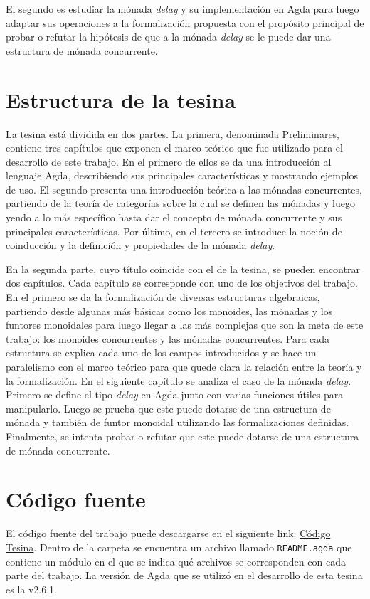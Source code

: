 El segundo es estudiar la mónada \textit{delay} y su implementación en Agda para luego adaptar sus operaciones a la formalización propuesta con el propósito principal de probar o refutar la hipótesis de que a la mónada \textit{delay} se le puede dar una estructura de mónada concurrente.

\section{Estructura de la tesina}

La tesina está dividida en dos partes. La primera, denominada Preliminares, contiene tres capítulos que exponen el marco teórico que fue utilizado para el desarrollo de este trabajo. En el primero de ellos se da una introducción al lenguaje Agda, describiendo sus principales características y mostrando ejemplos de uso. El segundo presenta una introducción teórica a las mónadas concurrentes, partiendo de la teoría de categorías sobre la cual se definen las mónadas y luego yendo a lo más específico hasta dar el concepto de mónada concurrente y sus principales características. Por último, en el tercero se introduce la noción de coinducción y la definición y propiedades de la mónada \textit{delay}. 

En la segunda parte, cuyo título coincide con el de la tesina, se pueden encontrar dos capítulos. Cada capítulo se corresponde con uno de los objetivos del trabajo. En el primero se da la formalización de diversas estructuras algebraicas, partiendo desde algunas más básicas como los monoides, las mónadas y los funtores monoidales para luego llegar a las más complejas que son la meta de este trabajo: los monoides concurrentes y las mónadas concurrentes. Para cada estructura se explica cada uno de los campos introducidos y se hace un paralelismo con el marco teórico para que quede clara la relación entre la teoría y la formalización. En el siguiente capítulo se analiza el caso de la mónada \textit{delay}. Primero se define el tipo \textit{delay} en Agda junto con varias funciones útiles para manipularlo. Luego se prueba que este puede dotarse de una estructura de mónada y también de funtor monoidal utilizando las formalizaciones definidas. Finalmente, se intenta probar o refutar que este puede dotarse de una estructura de mónada concurrente.

\section{Código fuente}

El código fuente del trabajo puede descargarse en el siguiente link: \href{https://github.com/ValeBini/Tesina/releases/tag/v1.0}{Código Tesina}. Dentro de la carpeta se encuentra un archivo llamado \texttt{README.agda} que contiene un módulo  en el que se indica qué archivos se corresponden con cada parte del trabajo. La versión de Agda que se utilizó en el desarrollo de esta tesina es la v2.6.1. 